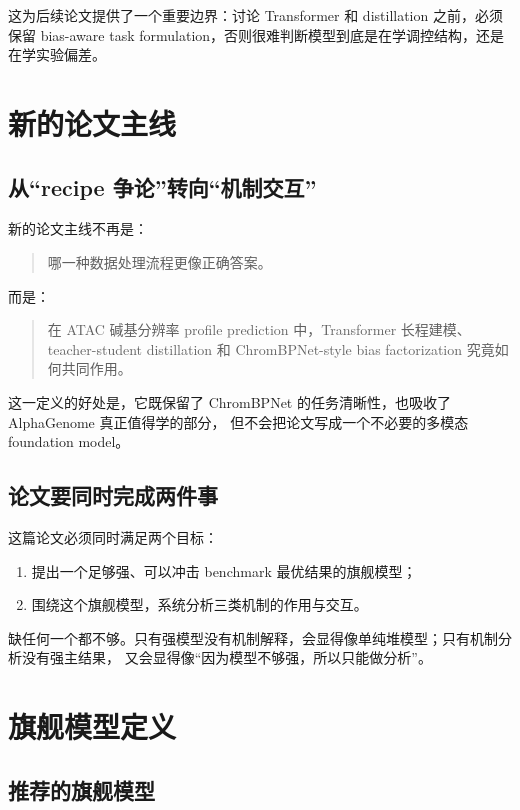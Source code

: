 \documentclass[11pt,a4paper]{ctexart}
\begin{document}
这为后续论文提供了一个重要边界：讨论 Transformer 和 distillation 之前，必须保留
bias-aware task formulation，否则很难判断模型到底是在学调控结构，还是在学实验偏差。

\section{新的论文主线}

\subsection{从“recipe 争论”转向“机制交互”}

新的论文主线不再是：
\begin{quote}
哪一种数据处理流程更像正确答案。
\end{quote}

而是：
\begin{quote}
在 ATAC 碱基分辨率 profile prediction 中，Transformer 长程建模、teacher-student
distillation 和 ChromBPNet-style bias factorization 究竟如何共同作用。
\end{quote}

这一定义的好处是，它既保留了 ChromBPNet 的任务清晰性，也吸收了 AlphaGenome 真正值得学的部分，
但不会把论文写成一个不必要的多模态 foundation model。

\subsection{论文要同时完成两件事}

这篇论文必须同时满足两个目标：
\begin{enumerate}[leftmargin=2em]
  \item 提出一个足够强、可以冲击 benchmark 最优结果的旗舰模型；
  \item 围绕这个旗舰模型，系统分析三类机制的作用与交互。
\end{enumerate}

缺任何一个都不够。只有强模型没有机制解释，会显得像单纯堆模型；只有机制分析没有强主结果，
又会显得像“因为模型不够强，所以只能做分析”。

\section{旗舰模型定义}

\subsection{推荐的旗舰模型}
\end{document}
